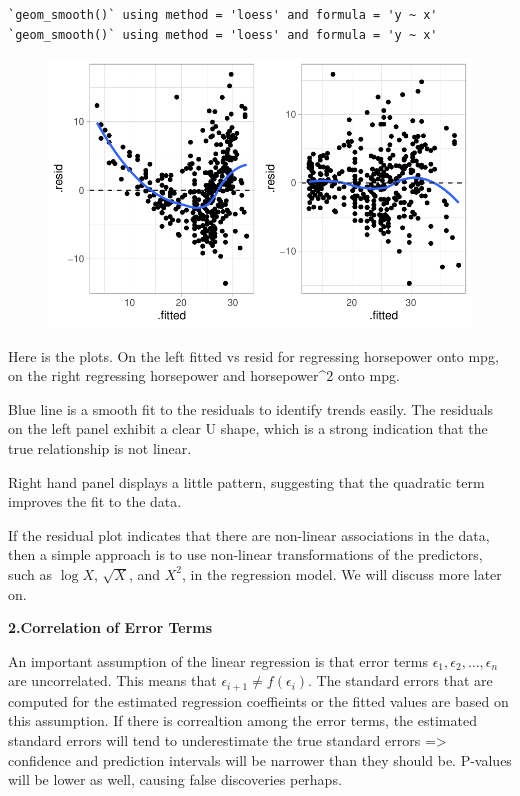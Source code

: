 \documentclass[
  letterpaper,
  DIV=11,
  numbers=noendperiod]{scrreprt}
\begin{document}
\begin{verbatim}
`geom_smooth()` using method = 'loess' and formula = 'y ~ x'
`geom_smooth()` using method = 'loess' and formula = 'y ~ x'
\end{verbatim}

\begin{figure}[H]

{\centering \includegraphics{Chapter3_files/figure-pdf/unnamed-chunk-95-1.pdf}

}

\end{figure}

Here is the plots. On the left fitted vs resid for regressing horsepower
onto mpg, on the right regressing horsepower and horsepower\^{}2 onto
mpg.

Blue line is a smooth fit to the residuals to identify trends easily.
The residuals on the left panel exhibit a clear U shape, which is a
strong indication that the true relationship is not linear.

Right hand panel displays a little pattern, suggesting that the
quadratic term improves the fit to the data.

If the residual plot indicates that there are non-linear associations in
the data, then a simple approach is to use non-linear transformations of
the predictors, such as \(\log X\), \(\sqrt{X}\), and \(X^2\), in the
regression model. We will discuss more later on.

\textbf{2.Correlation of Error Terms}

An important assumption of the linear regression is that error terms
\(\epsilon_1, \epsilon_2, \dots, \epsilon_n\) are uncorrelated. This
means that \(\epsilon_{i+1} \neq f(\epsilon_i)\). The standard errors
that are computed for the estimated regression coeffieints or the fitted
values are based on this assumption. If there is correaltion among the
error terms, the estimated standard errors will tend to underestimate
the true standard errors =\textgreater{} confidence and prediction
intervals will be narrower than they should be. P-values will be lower
as well, causing false discoveries perhaps.
\end{document}
